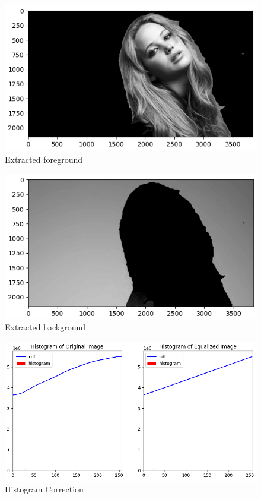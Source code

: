 \documentclass[11pt,a4paper]{article}
\begin{document}
{\begin{figure}[h]
    \centering
    \includegraphics[width=0.9\linewidth]{images/6-3.png}
    \caption{Extracted foreground}
\end{figure}}

{\begin{figure}[h]
    \centering
    \includegraphics[width=0.9\linewidth]{images/6-5.png}
    \caption{Extracted background}
\end{figure}}

{\begin{figure}[h]
    \centering
    \includegraphics[width=0.9\linewidth]{images/6-4.png}
    \caption{Histogram Correction}
\end{figure}}
\end{document}
